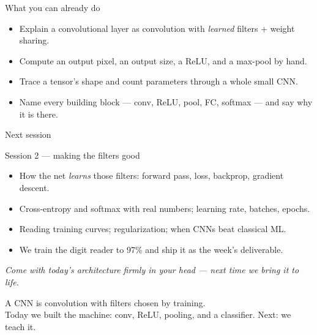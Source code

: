 \documentclass[10pt,aspectratio=169]{beamer}
\begin{document}
\begin{frame}{What you can already do}
  \begin{itemize}
    \item Explain a convolutional layer as convolution with \emph{learned} filters + weight sharing.
    \item Compute an output pixel, an output size, a ReLU, and a max-pool by hand.
    \item Trace a tensor's shape and count parameters through a whole small CNN.
    \item Name every building block --- conv, ReLU, pool, FC, softmax --- and say why it is there.
  \end{itemize}
\end{frame}

\begin{frame}{Next session}
  \begin{alertblock}{Session 2 --- making the filters good}
    \begin{itemize}
      \item How the net \emph{learns} those filters: forward pass, loss, backprop, gradient descent.
      \item Cross-entropy and softmax with real numbers; learning rate, batches, epochs.
      \item Reading training curves; regularization; when CNNs beat classical ML.
      \item We train the digit reader to 97\% and ship it as the week's deliverable.
    \end{itemize}
  \end{alertblock}
  \emph{Come with today's architecture firmly in your head --- next time we bring it to life.}
\end{frame}

\begin{frame}[standout]
  A CNN is convolution with filters chosen by training.\\[4pt]
  \normalsize Today we built the machine: conv, ReLU, pooling, and a classifier. Next: we teach it.
\end{frame}
\end{document}
